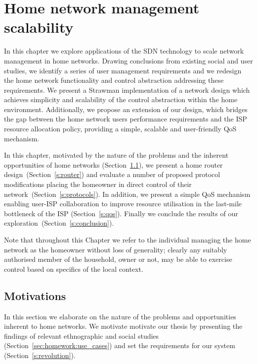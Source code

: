 \chapter{Home network management scalability} \label{sec:homework} 

\ifpdf
\graphicspath{{Chapter2/Chapter2Figs/PNG/}{Chapter2/Chapter2Figs/PDF/}{Chapter2/Chapter2Figs/}}
\else 
\graphicspath{{Chapter2/Chapter2Figs/EPS/}{Chapter2/Chapter2Figs/}} 
\fi

In this chapter we explore applications of the SDN technology to scale network
management in home networks. Drawing conclusions from existing social and user
studies, we identify a series of user management requirements and we  
redesign the home network functionality and control abstraction addressing these
requirements. We present a Strawman implementation of a network design which
achieves simplicity and scalability of the control abstraction within the home
environment. Additionally, we propose an extension of our design, which bridges
the gap between the home network users performance requirements and the ISP
resource allocation policy, providing a simple, scalable and user-friendly QoS
mechanism.

In this chapter, motivated by the nature of the problems and the inherent
opportunities of home networks (Section~\ref{s:evolution}),  we present a home
router design~(Section~\ref{s:router}) and evaluate a number of proposed
protocol modifications placing the homeowner in direct control of their
network~(Section~\ref{s:protocols}). In addition, we present a simple QoS
mechanism enabling user-ISP collaboration to improve resource utilisation in the
last-mile bottleneck of the ISP (Section~\ref{s:qos}). Finally we conclude
the results of our exploration~(Section~\ref{s:conclusion}).

Note that throughout this Chapter we refer to the individual managing the home
network as the homeowner without loss of generality; clearly any suitably
authorised member of the household, owner or not, may be able to exercise control
based on specifics of the local context. 

\section{Motivations}\label{s:evolution}

In this section we elaborate on the nature of the problems and opportunities
inherent to home networks. We motivate motivate our thesis by presenting the
findings of relevant ethnographic and social studies
(Section~\ref{sec:homework:use_cases}) and set the requirements for our system
(Section~\ref{s:revolution}). 

